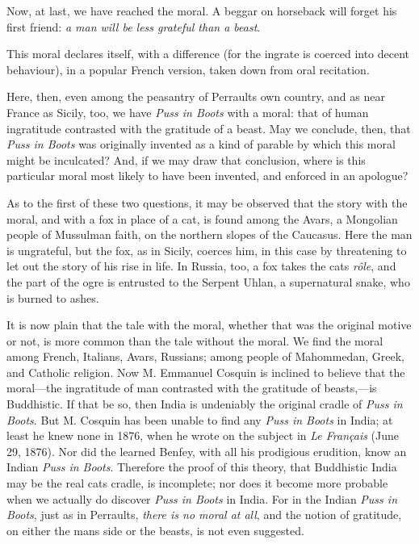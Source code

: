 \documentclass[14pt,a4paper]{memoir}
\begin{document}
{Now, at last, we have reached the moral. A beggar on horseback will
forget his first friend: \emph{a man will be less grateful than a
beast}.

This moral declares itself, with a difference (for the ingrate is
coerced into decent behaviour), in a popular French version, taken down
from oral
recitation.

Here, then, even among the peasantry of Perrault\textquotesingle s own
country, and as near France as Sicily, too, we have \emph{Puss in Boots}
with a moral: that of human ingratitude contrasted with the gratitude of
a beast. May we conclude, then, that \emph{Puss in Boots} was originally
invented as a kind of parable by which this moral might be inculcated?
And, if we may draw that conclusion, where is this particular moral most
likely to have been invented, and enforced in an apologue?

As to the first of these two questions, it may be observed that the
story with the moral, and with a fox in place of a cat, is found among
the Avars, a Mongolian people of Mussulman faith, on the northern slopes
of the Caucasus. Here the man is ungrateful, but the fox, as in Sicily,
coerces him, in this case by threatening to let out the story of his
rise in
life.
In Russia, too, a fox takes the cat\textquotesingle s \emph{rôle}, and
the part of the ogre is entrusted to the Serpent Uhlan, a supernatural
snake, who is burned to
ashes.

It is now plain that the tale with the moral, whether that was the
original motive or not, is more common than the tale without the moral.
We find the moral among French, Italians, Avars, Russians; among people
of Mahommedan, Greek, and Catholic religion. Now M. Emmanuel Cosquin is
inclined to believe that the moral---the ingratitude of man contrasted
with the gratitude of beasts,---is Buddhistic. If that be so, then India
is undeniably the original cradle of \emph{Puss in Boots}. But M.
Cosquin has been unable to find any \emph{Puss in Boots} in India; at
least he knew none in 1876, when he wrote on the subject in \emph{Le
Français} (June 29, 1876). Nor did the learned Benfey, with all his
prodigious erudition, know an Indian \emph{Puss in
Boots}.
Therefore the proof of this theory, that Buddhistic India may be the
real cat\textquotesingle s cradle, is incomplete; nor does it become
more probable when we actually do discover \emph{Puss in Boots} in
India. For in the Indian \emph{Puss in Boots}, just as in
Perrault\textquotesingle s, \emph{there is no moral at all}, and the
notion of gratitude, on either the man\textquotesingle s side or the
beast\textquotesingle s, is not even suggested.

}
\end{document}
